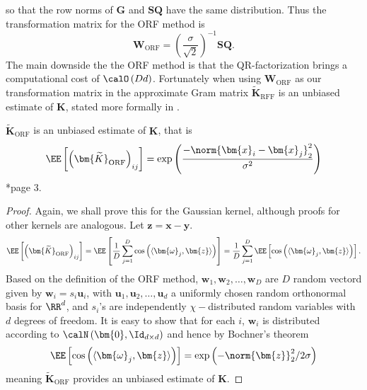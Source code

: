 so that the row norms of $\bm{G}$ and $\bm{S} \bm{Q}$ have the same distribution. Thus the transformation matrix for the ORF method is
\begin{equation}
    \bm{W}_{\text{ORF}} = \left( \frac{\sigma}{\sqrt{2}} \right)^{-1} \bm{S} \bm{Q}.
\end{equation}
The main downside the the ORF method is that the QR-factorization brings a computational cost of $\calO \left( Dd \right)$. Fortunately when using $\bm{W}_{\text{ORF}}$ as our transformation matrix in  the approximate Gram matrix $\bm{\widetilde{K}}_{\text{RFF}}$ is an unbiased estimate of $\bm{K}$, stated more formally in .

\begin{thm} \label{thm: orf-unbiased}
    $\bm{\widetilde{K}}_{\text{ORF}}$ is an unbiased estimate of $\bm{K}$, that is
    \[
        \EE \left[ \left( \bm{\widetilde{K}}_{\text{ORF}} \right)_{ij} \right] = \exp \left( \frac{- \norm{\bm{x}_i - {\bm{x}_j}}_{2}^{2}}{\sigma^2} \right)
    \] \cite{YuFelixX2016ORF}*{page 3}.
\end{thm}
\begin{proof}
    Again, we shall prove this for the Gaussian kernel, although proofs for other kernels are analogous. Let $\bm{z} = \bm{x} - \bm{y}$.
    \begin{equation*}
        \EE \left[ \left( \bm{\widetilde{K}}_{\text{ORF}} \right)_{ij} \right] = \EE \left[ \frac{1}{D} \sum_{j=1}^{D} \cos \left( \langle \bm{\omega}_j , \bm{z} \rangle \right) \right] = \frac{1}{D} \sum_{j=1}^{D} \EE \left[ \cos \left( \langle \bm{\omega}_j , \bm{z} \rangle \right) \right].
    \end{equation*}
    Based on the definition of the ORF method, $\bm{w}_1 , \bm{w}_2 , \ldots , \bm{w}_D$ are $D$ random vectord given by $\bm{w}_i = s_i \bm{u}_i$, with $\bm{u}_1 , \bm{u}_2 , \ldots , \bm{u}_d$ a uniformly chosen random orthonormal basis for $\RR^d$, and $s_i$'s are independently $\chi-$distributed random variables with $d$ degrees of freedom. It is easy to show that for each $i$, $\bm{w}_i$ is distributed according to $\calN \left( \bm{0}, \Id_{d \times d} \right)$ and hence by Bochner's theorem
    \[
        \EE \left[ \cos \left( \langle \bm{\omega}_j , \bm{z} \rangle \right) \right] = \exp \left( - \norm{\bm{z}}^2_2 / 2 \sigma \right)
    \]
    meaning $\bm{\widetilde{K}}_{\text{ORF}}$ provides an unbiased estimate of $\bm{K}$.
\end{proof}

